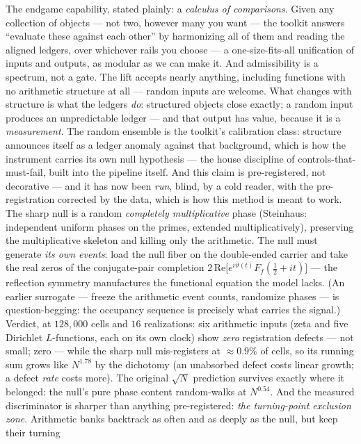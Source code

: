 \documentclass[11pt]{article}
\begin{document}
The endgame capability, stated plainly: a \emph{calculus of comparisons}.  Given
any collection of objects --- not two, however many you want --- the toolkit
answers ``evaluate these against each other'' by harmonizing all of them and
reading the aligned ledgers, over whichever rails you choose --- a
one-size-fits-all unification of inputs and outputs, as modular as we can make
it.  And admissibility is a spectrum, not a gate.  The lift accepts nearly
anything, including functions with no arithmetic structure at all --- random
inputs are welcome.  What changes with structure is what the ledgers \emph{do}:
structured objects close exactly; a random input produces an unpredictable
ledger --- and that output has value, because it is a \emph{measurement}.  The
random ensemble is the toolkit's calibration class: structure announces itself
as a ledger anomaly against that background, which is how the instrument
carries its own null hypothesis --- the house discipline of controls-that-must-fail,
built into the pipeline itself.  And this claim is pre-registered, not
decorative --- and it has now been \emph{run}, blind, by a cold reader, with
the pre-registration corrected by the data, which is how this method is meant
to work.  The sharp null is a random \emph{completely multiplicative} phase
(Steinhaus: independent uniform phases on the primes, extended
multiplicatively), preserving the multiplicative skeleton and killing only the
arithmetic.  The null must generate \emph{its own events}: load the null fiber
on the double-ended carrier and take the real zeros of the conjugate-pair
completion $2\,\mathrm{Re}\bigl[e^{i\vartheta(t)}F_f(\tfrac12+it)\bigr]$ ---
the reflection symmetry manufactures the functional equation the model lacks.
(An earlier surrogate --- freeze the arithmetic event counts, randomize
phases --- is question-begging: the occupancy sequence is precisely what
carries the signal.)  Verdict, at $128{,}000$ cells and $16$ realizations: six
arithmetic inputs (zeta and five Dirichlet $L$-functions, each on its own
clock) show \emph{zero} registration defects --- not small; zero --- while
the sharp null mis-registers at $\approx0.9\%$ of cells, so its running sum
grows like $N^{1.78}$ by the dichotomy (an unabsorbed defect costs linear
growth; a defect \emph{rate} costs more).  The original $\sqrt N$ prediction
survives exactly where it belonged: the null's pure phase content
random-walks at $N^{0.54}$.  And the measured discriminator is sharper than
anything pre-registered: \emph{the turning-point exclusion zone}.  Arithmetic
banks backtrack as often and as deeply as the null, but keep their turning
\end{document}
